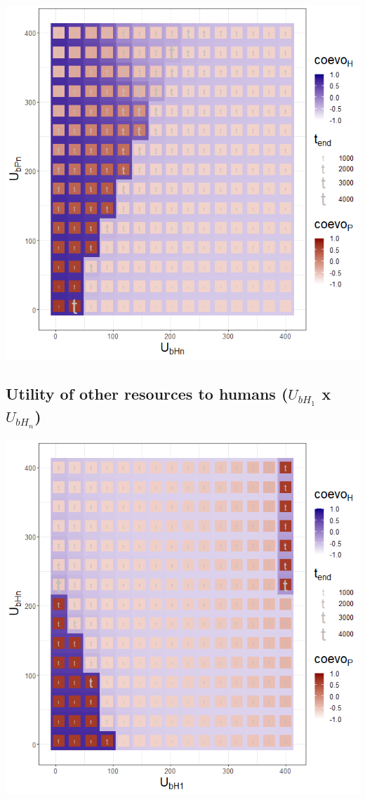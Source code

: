 \documentclass[
]{book}
\begin{document}

\includegraphics[width=1\linewidth]{plots/3_twoPar-U.bHn-U.bPn_plot}

\newpage

\hypertarget{utility-of-other-resources-to-humans-u_bh_1-x-u_bh_n}{%
\subsection{\texorpdfstring{Utility of other resources to humans (\(U_{bH_{1}}\) x \(U_{bH_{n}}\))}{Utility of other resources to humans (U\_\{bH\_\{1\}\} x U\_\{bH\_\{n\}\})}}\label{utility-of-other-resources-to-humans-u_bh_1-x-u_bh_n}}


\includegraphics[width=1\linewidth]{plots/3_twoPar-U.bH1-U.bHn_plot}
\end{document}
